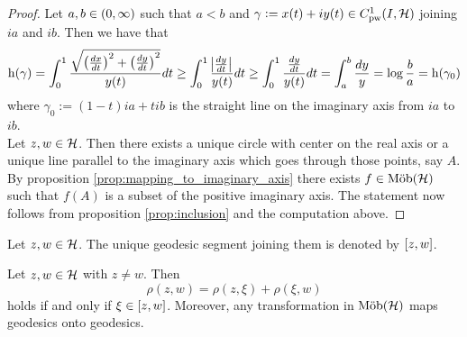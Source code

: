 \begin{proof}
	Let $a,b \in \intoo{0,\infty}$ such that $a < b$ and $\gamma := x(t) + iy(t) \in C^1_{\mathrm{pw}}(I,\mathcal{H})$ joining $ia$ and $ib$. Then we have that
	\begin{equation*}
		\h(\gamma) =  \int_0^1 \frac{\sqrt{\del[1]{\frac{dx}{dt}}^2 + \del[1]{\frac{dy}{dt}}^2}}{y(t)} dt  \geq  \int_0^1 \frac{\abs[1]{\frac{dy}{dt}}}{y(t)} dt \geq  \int_0^1 \frac{\frac{dy}{dt}}{y(t)} dt = \int_a^b \frac{dy}{y} = \log \frac{b}{a} = \h(\gamma_0)
	\end{equation*}
	\noindent where $\gamma_0 := (1 - t)ia + tib$ is the straight line on the imaginary axis from $ia$ to $ib$.\\
	Let $z,w \in \mathcal{H}$. Then there exists a unique circle with center on the real axis or a unique line parallel to the imaginary axis which goes through those points, say $A$. By proposition \ref{prop:mapping_to_imaginary_axis} there exists $f \in \mathrm{M\ddot{o}b}(\mathcal{H})$ such that $f(A)$ is a subset of the positive imaginary axis. The statement now follows from proposition \ref{prop:inclusion} and the computation above.
\end{proof}

\begin{definition}
	Let $z,w \in \mathcal{H}$. The unique geodesic segment joining them is denoted by $\sbr[0]{z,w}$.
\end{definition}

\begin{corollary}
	Let $z,w \in \mathcal{H}$ with $z \neq w$. Then
	\begin{equation}
		\rho(z,w) = \rho(z,\xi) + \rho(\xi,w)
	\end{equation}
	\noindent holds if and only if $\xi \in \sbr[0]{z,w}$. Moreover, any transformation in $\mathrm{M\ddot{o}b}(\mathcal{H})$ maps geodesics onto geodesics.
\end{corollary}


